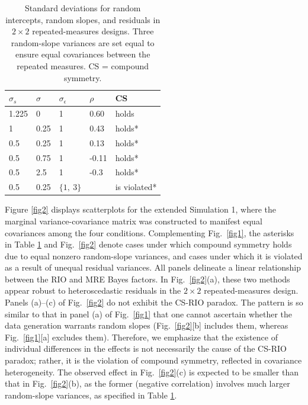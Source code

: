 \documentclass[preprint,12pt,authoryear]{elsarticle}
\begin{document}
\begin{table}[t]
	\centering
	\begin{tabular}{@{}lllll@{}}
		\toprule
		$\sigma_s$ & $\sigma$ & $\sigma_\epsilon$ & $\rho$ & CS           \\ \midrule
		1.225      & 0        & 1                 & 0.60   & holds        \\
		1          & 0.25     & 1                 & 0.43   & holds*       \\
		0.5        & 0.25     & 1                 & 0.13   & holds*       \\
		0.5        & 0.75     & 1                 & -0.11  & holds*       \\
		0.5        & 2.5      & 1                 & -0.3   & holds*       \\
		0.5        & 0.25     & $\{1,\ \!3\}$     &        & is violated* \\ \bottomrule
	\end{tabular}
\caption{Standard deviations for random intercepts, random slopes, and residuals in $2\times2$ repeated-measures designs. Three random-slope variances are set equal to ensure equal covariances between the repeated measures. CS = compound symmetry.}\label{tbl5}
\end{table}

Figure \ref{fig2} displays scatterplots for the extended Simulation 1, where the marginal variance-covariance matrix was constructed to manifest equal covariances among the four conditions. Complementing Fig.~\ref{fig1}, the asterisks in Table \ref{tbl5} and Fig.~\ref{fig2} denote cases under which compound symmetry holds due to equal nonzero random-slope variances, and cases under which it is violated as a result of unequal residual variances. All panels delineate a linear relationship between the RIO and MRE Bayes factors. In Fig.~\ref{fig2}(a), these two methods appear robust to heteroscedastic residuals in the $2\times2$ repeated-measures design. Panels (a)–(c) of Fig.~\ref{fig2} do not exhibit the CS-RIO paradox. The pattern is so similar to that in panel (a) of Fig.~\ref{fig1} that one cannot ascertain whether the data generation warrants random slopes (Fig.~\ref{fig2}[b] includes them, whereas Fig.~\ref{fig1}[a] excludes them). Therefore, we emphasize that the existence of individual differences in the effects is not necessarily the cause of the CS-RIO paradox; rather, it is the violation of compound symmetry, reflected in covariance heterogeneity. The observed effect in Fig.~\ref{fig2}(c) is expected to be smaller than that in Fig.~\ref{fig2}(b), as the former (negative correlation) involves much larger random-slope variances, as specified in Table \ref{tbl5}.
\end{document}
